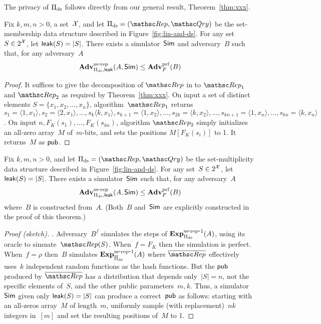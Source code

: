 The privacy of $\Pi_{\mathrm{ds}}$ follows directly from our general result, Theorem~\ref{thm:xxx}.
\begin{theorem}\label{thm:ds-ss}
Fix $k,m,n>0$, a set~${\cal X}$, and let $\setprim_{\mathrm{ds}}= (\Rep, \Qry)$ be the set-membership data structure described in Figure~\ref{fig:lin-and-ds}.  For any set~$S \in 2^{\cal X}$, let ${\sf leak}(S)=|S|$.  There exists a simulator~${\sf Sim}$ and adversary~$B$ such that, for any adversary~$A$
\[
\mathrm{\mathbf{Adv}}^{\mathrm{ss\mbox{-}rep}}_{\Pi_{\mathrm{ds}},{\sf leak}}(A,{\sf Sim}) \leq  \mathbf{Adv}^{\mathrm{prf}}_{F}(B)
\]
\end{theorem}
\begin{proof}
It suffices to give the decomposition of $\Rep$ in to $\Rep_1$ and $\Rep_2$ as required by Theorem~\ref{thm:xxx}.
On input a set of distinct elements $S=\{x_1,x_2,\ldots,x_n\}$, algorithm~$\Rep_1$ returns $s_1=\langle 1,x_1 \rangle, s_2=\langle 2,x_1 \rangle, \ldots, s_k\langle k,x_1\rangle, s_{k+1}=\langle 1,x_2\rangle, \ldots, s_{2k}=\langle k,x_2\rangle, \ldots ,s_{kn+1}=\langle 1,x_n\rangle, \ldots, s_{kn}=\langle k,x_n \rangle$.  On input $n,F_K(s_1),\ldots,F_K(s_{kn})$, algorithm $\Rep_2$ simply initializes an all-zero array~$M$ of~$m$-bits, and sets the positions $M[F_K(s_i)]$ to 1.  It returns~$M$ as ${\sf pub}$.
\end{proof}

\begin{theorem}\label{thm:ds-ss}
Fix $k,m,n>0$, and let $\setprim_{\mathrm{ds}}= (\Rep, \Qry)$ be the set-multiplicity data structure described in Figure~\ref{fig:lin-and-ds}.  For any set~$S \in 2^{\cal X}$, let ${\sf leak}(S)=|S|$.  There exists a simulator~${\sf Sim}$ such that, for any adversary~$A$
\[
\mathrm{\mathbf{Adv}}^{\mathrm{ss\mbox{-}rep}}_{\Pi_{\mathrm{ds}},{\sf leak}}(A,{\sf Sim}) \leq  \mathbf{Adv}^{\mathrm{prf}}_{F}(B)
\]
where~$B$ is constructed from~$A$.  (Both~$B$ and~${\sf Sim}$ are explicitly constructed in the proof of this theorem.)
\end{theorem}
\begin{proof}[Proof (sketch). ] 
Adversary~$B^{f}$ simulates the steps of $\mathrm{\mathbf{Exp}}^{\mathrm{ss\mbox{-}rep\mbox{-}1}}_{\Pi_{\mathrm{ds}}}(A)$, using its oracle to simuate~$\Rep(S)$.  When~$f=F_K$ then the simulation is perfect.  When~$f=\rho$ then~$B$ simulates $\mathrm{\mathbf{Exp}}^{\mathrm{ss\mbox{-}rep\mbox{-}1}}_{\overline{\Pi}_{\mathrm{ds}}}(A)$ where $\overline{\Rep}$ effectively uses~$k$ independent random functions as the hash functions.  But the ${\sf pub}$ produced by $\overline{\Rep}$ has a distribution that depends only~$|S|=n$, not the specific elements of~$S$, and the other public parameters~$m,k$.  Thus, a simulator~${\sf Sim}$ given only ${\sf leak}(S)=|S|$ can produce a correct~${\sf pub}$ as follows: starting with an all-zeros array~$M$ of length~$m$, uniformly sample (with replacement)~$nk$ integers in~$[m]$ and set the resulting positions of~$M$ to 1.
\end{proof}

